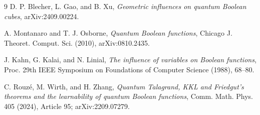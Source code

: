 \documentclass[11pt]{article}
\begin{document}
\begin{thebibliography}{9}
D. P. Blecher, L. Gao, and B. Xu,
\emph{Geometric influences on quantum Boolean cubes},
arXiv:2409.00224.

A. Montanaro and T. J. Osborne,
\emph{Quantum Boolean functions},
Chicago J. Theoret. Comput. Sci. (2010), arXiv:0810.2435.

J. Kahn, G. Kalai, and N. Linial,
\emph{The influence of variables on Boolean functions},
Proc. 29th IEEE Symposium on Foundations of Computer Science (1988), 68--80.

C. Rouz\'e, M. Wirth, and H. Zhang,
\emph{Quantum Talagrand, KKL and Friedgut's theorems and the learnability of
quantum Boolean functions}, Comm. Math. Phys. 405 (2024), Article 95;
arXiv:2209.07279.
\end{thebibliography}
\end{document}
